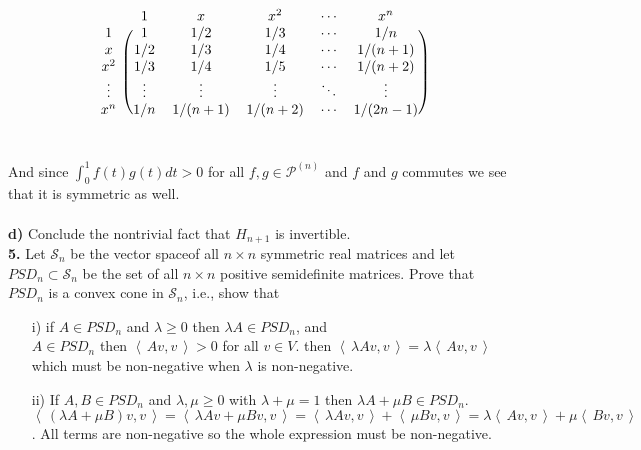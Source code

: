 \documentclass[11pt]{amsart}
\theoremstyle{definition}  %
\newcommand{\IP}[1]{\left \langle\, #1 \,\right \rangle}
\newcommand{\PP}{\mathcal{P}}
\begin{document}
\begin{align*}
\begin{blockarray}{cccccc}
 & 1 & x & x^2 & \cdots & x^n  \\
\begin{block}{c(ccccc)}
  1 & 1 & 1/2 & 1/3 & \cdots & 1/n  \\
  x & 1/2 & 1/3 & 1/4 & \cdots & 1/(n+1)  \\
  x^2 & 1/3 & 1/4 & 1/5 & \cdots & 1/(n+2)  \\
  \vdots & \vdots & \vdots & \vdots & \ddots & \vdots  \\
  x^n & 1/n & 1/(n+1) & 1/(n+2) & \cdots & 1/(2n-1)  \\
\end{block}
\end{blockarray}
\end{align*}\\
And since $ \int_0^1 f(t)g(t) dt>0$ for all $f,g \in \PP^{(n)}$ and $f$ and $g$ commutes we see that it is symmetric as well.\\
\\
{\bf d)} Conclude the nontrivial fact that $H_{n+1}$ is invertible. \\

\newpage
\vskip 0.1cm
\noindent
{\bf 5.} Let $\mathcal{S}_n$ be the vector spaceof all $n \times n$ symmetric real matrices and let $PSD_n \subset \mathcal{S}_n$ be the set of all $n \times n$ positive semidefinite matrices.
Prove that $PSD_n$ is a convex cone in $\mathcal{S}_n$, i.e., show that
\begin{itemize}
\item[i)] if $A \in PSD_n$ and $\lambda \geq 0$ then $\lambda A \in PSD_n$, and \\

$A \in PSD_n$ then $\IP{Av,v} > 0$ for all $v\in V$.  then $\IP{\lambda Av,v} = \lambda \IP{Av,v}$ which must be non-negative when $\lambda$ is non-negative.\\

\item[ii)] If $A, B \in PSD_n$ and $\lambda, \mu \geq 0$ with $\lambda + \mu = 1$ then $\lambda A + \mu B \in PSD_n$. \\

$\IP{(\lambda A + \mu B)v,v} = \IP{\lambda A v + \mu B v, v} = \IP{\lambda A v,v} + \IP{\mu B v,v} = \lambda \IP{Av,v} + \mu \IP{Bv,v}$.  All terms are non-negative so the whole expression must be non-negative.
\end{itemize}
\end{document}

